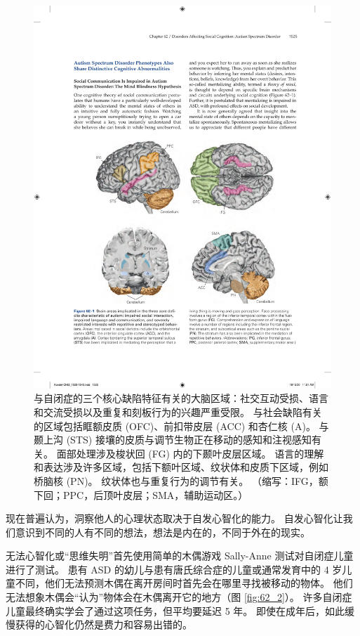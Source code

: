\begin{figure}[htbp]
	\centering
	\includegraphics[width=0.8\linewidth]{chap62/fig_62_1}
	\caption{与自闭症的三个核心缺陷特征有关的大脑区域：社交互动受损、语言和交流受损以及重复和刻板行为的兴趣严重受限。 与社会缺陷有关的区域包括眶额皮质 (OFC)、前扣带皮层 (ACC) 和杏仁核 (A)。 与颞上沟 (STS) 接壤的皮质与调节生物正在移动的感知和注视感知有关。 面部处理涉及梭状回 (FG) 内的下颞叶皮层区域。 语言的理解和表达涉及许多区域，包括下额叶区域、纹状体和皮质下区域，例如桥脑核 (PN)。 纹状体也与重复行为的调节有关。 （缩写：IFG，额下回；PPC，后顶叶皮层；SMA，辅助运动区。）}
	\label{fig:62_1}
\end{figure}

现在普遍认为，洞察他人的心理状态取决于自发心智化的能力。 自发心智化让我们意识到不同的人有不同的想法，想法是内在的，不同于外在的现实。

无法心智化或“思维失明”首先使用简单的木偶游戏 Sally-Anne 测试对自闭症儿童进行了测试。 患有 ASD 的幼儿与患有唐氏综合症的儿童或通常发育中的 4 岁儿童不同，他们无法预测木偶在离开房间时首先会在哪里寻找被移动的物体。 他们无法想象木偶会“认为”物体会在木偶离开它的地方（图 \ref{fig:62_2}）。 许多自闭症儿童最终确实学会了通过这项任务，但平均要延迟 5 年。 即使在成年后，如此缓慢获得的心智化仍然是费力和容易出错的。

